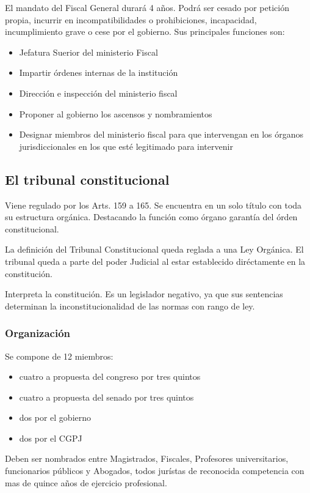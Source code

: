     El mandato del Fiscal General durará 4 años. Podrá ser cesado por petición propia, incurrir en incompatibilidades o prohibiciones, incapacidad, incumplimiento grave o cese por el gobierno. Sus principales funciones son:
    \begin{itemize}
        \item Jefatura Suerior del ministerio Fiscal
        \item Impartir órdenes internas de la institución
        \item Dirección e inspección del ministerio fiscal
        \item Proponer al gobierno los ascensos y nombramientos
        \item Designar miembros del ministerio fiscal para que intervengan en los órganos jurisdiccionales en los que esté legitimado para intervenir
    \end{itemize}

\subsection{El tribunal constitucional} %
    Viene regulado por los Arts. 159 a 165. Se encuentra en un solo título con toda su estructura orgánica. Destacando la función como órgano garantía del órden constitucional.

    La definición del Tribunal Constitucional queda reglada a una Ley Orgánica. El tribunal queda a parte del poder Judicial al estar establecido diréctamente en la constitución. 

    Interpreta la constitución. Es un legislador negativo, ya que sus sentencias determinan la inconstitucionalidad de las normas con rango de ley.

    \subsubsection{Organización} %
        Se compone de 12 miembros:
        \begin{itemize}
            \item cuatro a propuesta del congreso por tres quintos
            \item cuatro a propuesta del senado por tres quintos
            \item dos por el gobierno
            \item dos por el CGPJ
        \end{itemize} 
        
        Deben ser nombrados entre Magistrados, Fiscales, Profesores universitarios, funcionarios públicos y Abogados, todos jurístas de reconocida competencia con mas de quince años de ejercicio profesional.

